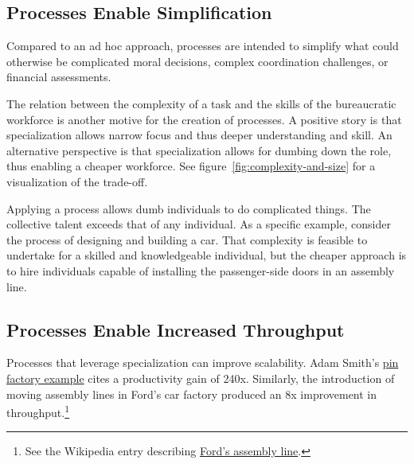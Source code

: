 


\subsection*{Processes Enable Simplification}
Compared to an ad hoc approach, processes are intended to simplify what could otherwise be complicated moral decisions, complex coordination challenges, or financial assessments. %


The relation between the complexity of a task and the skills of the bureaucratic workforce is another motive for the creation of processes.
A positive story is that specialization allows narrow focus and thus deeper understanding and skill. An alternative perspective is that specialization allows for dumbing down the role, thus enabling a cheaper workforce. See figure~\ref{fig:complexity-and-size} \iftoggle{haspagenumbers}{on page~\pageref{fig:complexity-and-size}}{}
for a visualization of the trade-off.

Applying a process allows dumb individuals to do complicated things. The collective talent exceeds that of any individual.  As a specific example, consider the process of designing and building a car. That complexity is feasible to undertake for a skilled and knowledgeable individual, but the cheaper approach is to hire individuals capable of installing the passenger-side doors in an assembly line.


\subsection*{Processes Enable Increased Throughput}

Processes that leverage specialization can improve scalability. Adam Smith's \href{https://en.wikipedia.org/wiki/Business_process#Adam_Smith}{pin factory example} cites a productivity gain of 240x.
Similarly, the introduction of moving assembly lines in Ford's car factory produced an 8x improvement in throughput.\footnote{See the Wikipedia entry describing \href{https://en.wikipedia.org/wiki/Assembly_line\%2320th_century}{Ford's assembly line}.
} 


